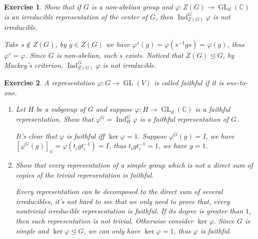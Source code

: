 \documentclass[11pt]{report}
\theoremstyle{mythm}
\let\oldendproof\endproof
\renewenvironment{proof}[1][\proofname]{%
  \oldproof[\normalfont \bfseries #1]%
}{\oldendproof}
\newtheorem{exercise}{Exercise}[chapter]
\renewcommand*{\proofname}{Proof}
\theoremstyle{myans}
\newcommand{\bbC}{\mathbb C}
\DeclareMathOperator{\GL}{GL}
\DeclareMathOperator{\Ind}{Ind}
\begin{document}
\begin{exercise}
  Show that if $G$ is a non-abelian group and $\varphi\colon Z(G) \to \GL_d(\bbC)$ is
  an irreducible representation of the center of $G$, then $\Ind^G_{Z(G)}\varphi$ is not irreducible.
  \begin{proof}
    Take $s\notin Z(G)$, by $g\in Z(G)$ we have $\varphi^s(g) = \varphi(s^{-1}gs) = \varphi(g)$,
    thus $\varphi^s = \varphi$. Since $G$ is non-abelian, such $s$ exists. Noticed that
    $Z(G) \trianglelefteq G$, by Mackey's criterion, $\Ind_{Z(G)}^G \varphi$ is not irreducible.
  \end{proof}
\end{exercise}

\begin{exercise}
  A representation $\varphi \colon G\to \GL(V)$ is called \emph{faithful} if it is one-to-one.
  \begin{enumerate}
    \item Let $H$ be a subgroup of $G$ and suppose $\varphi\colon H \to \GL_d(\bbC)$ is a faithful
    representation. Show that $\varphi^G = \Ind^G_H \varphi$ is a faithful representation of $G$.
    \begin{proof}
      It's clear that $\varphi$ is faithful iff $\ker \varphi = 1$. Suppose $\varphi^G(g) = I$,
      we have $[\varphi^G(g)]_{ii} = \varphi(t_i gt_i^{-1}) = I$, thus $t_igt_i^{-1} = 1$, we have
      $g = 1$.
    \end{proof}
    \item Show that every representation of a simple group which is not a direct sum of
    copies of the trivial representation is faithful.
    \begin{proof}
      Every representation can be decomposed to the direct sum of several irreducibles, it's not hard
      to see that we only need to prove that, every nontrivial irreducible representation is faithful.
      If its degree is greater than $1$, then such representation is not trivial. Otherwise consider
      $\ker \varphi$. Since $G$ is simple and $\ker \varphi \trianglelefteq G$, we can only have
      $\ker \varphi = 1$, thus $\varphi$ is faithful.
    \end{proof}
  \end{enumerate}
\end{exercise}
\end{document}
